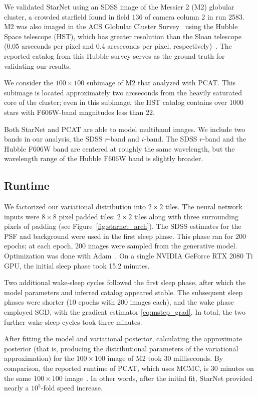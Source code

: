 \label{sec:results_on_m2}
We validated StarNet using an SDSS image of the Messier 2 (M2) globular cluster, a crowded starfield found in field 136 of camera column 2 in run 2583.
M2 was also imaged in the ACS Globular Cluster Survey~\cite{Sarajedini_2007}
using the Hubble Space telescope (HST),
which has greater resolution than the Sloan telescope (0.05 arseconds per pixel and 0.4 arcseconds per pixel, respectively)~\cite{hubble_about, sdss_about}. The reported catalog from this Hubble survey serves as the ground truth for validating our results.

We consider the $100 \times 100$ subimage of M2 that \cite{Portillo_2017, Feder_2019} analyzed with PCAT.
This subimage is located approximately two arcseconds from the heavily saturated core of the cluster;
even in this subimage, the HST catalog contains over 1000 stars with F606W-band magnitudes less than 22.

Both StarNet and PCAT are able to model multiband images. We include two bands in our analysis, the SDSS $r$-band and $i$-band. 
The SDSS $r$-band and the Hubble F606W band are centered at roughly the same wavelength, but the wavelength range of the Hubble F606W band is slightly broader. 

\subsection{Runtime} 
\label{sec:runtime}
We factorized our variational distribution into $2\times2$ tiles. 
The neural network inputs were $8\times8$ pixel padded tiles: 
$2\times 2$ tiles along with three surrounding pixels of padding (see Figure~\ref{fig:starnet_arch}). 
The SDSS estimates for the PSF and background were used in the first sleep phase. 
This phase ran for 200 epochs; at each epoch, 200 images were sampled from the generative model. 
Optimization was done with Adam~\cite{kingma2014adam}. 
On a single NVIDIA GeForce RTX 2080 Ti GPU, 
the initial sleep phase took 15.2 minutes.

Two additional wake-sleep cycles followed the first sleep phase, 
after which the model parameters and inferred catalog appeared stable.
The subsequent sleep phases were shorter (10 epochs with 200 images each), and the wake phase employed SGD, with the gradient estimator \eqref{eq:mstep_grad}. In total, the two further wake-sleep cycles took three minutes. 

After fitting the model and variational posterior, calculating the approximate posterior (that is, producing the distributional parameters of the variational approximation) for the $100 \times 100$ image of M2 took $30$ milliseconds. 
By comparison, the reported runtime of PCAT, which uses MCMC, is 30 minutes on the same $100 \times 100$ image~\cite{Feder_2019}.
In other words, after the initial fit, StarNet provided nearly a $10^5$-fold speed increase. 

